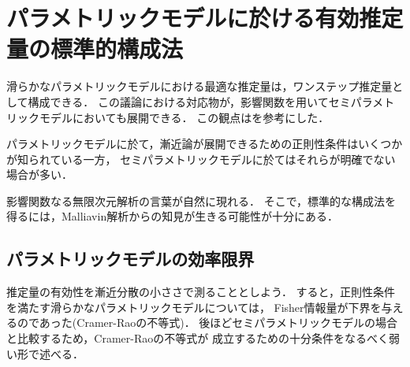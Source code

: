 \documentclass[uplatex, dvipdfmx]{jsarticle}
\begin{document}
\section{パラメトリックモデルに於ける有効推定量の標準的構成法}

\begin{tcolorbox}[colframe=ForestGreen, colback=ForestGreen!10!white,breakable,colbacktitle=ForestGreen!40!white,coltitle=black,fonttitle=\bfseries\sffamily,
title=]
    滑らかなパラメトリックモデルにおける最適な推定量は，ワンステップ推定量として構成できる．
    この議論における対応物が，影響関数を用いてセミパラメトリックモデルにおいても展開できる．
    この観点は\cite{Kennedy}を参考にした．

    パラメトリックモデルに於て，漸近論が展開できるための正則性条件はいくつかが知られている一方，
    セミパラメトリックモデルに於てはそれらが明確でない場合が多い．

    影響関数なる無限次元解析の言葉が自然に現れる．
    そこで，標準的な構成法を得るには，Malliavin解析からの知見が生きる可能性が十分にある．
\end{tcolorbox}

\subsection{パラメトリックモデルの効率限界}

\begin{tcolorbox}[colframe=ForestGreen, colback=ForestGreen!10!white,breakable,colbacktitle=ForestGreen!40!white,coltitle=black,fonttitle=\bfseries\sffamily,
title=]
    推定量の有効性を漸近分散の小ささで測ることとしよう．
    すると，正則性条件を満たす滑らかなパラメトリックモデルについては，
    Fisher情報量が下界を与えるのであった(Cramer-Raoの不等式)．
    後ほどセミパラメトリックモデルの場合と比較するため，Cramer-Raoの不等式が
    成立するための十分条件をなるべく弱い形で述べる．
\end{tcolorbox}
\end{document}

